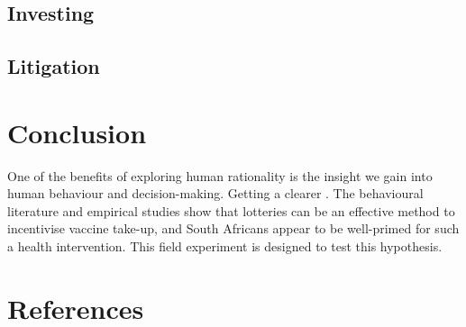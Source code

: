 \documentclass[11pt,preprint, authoryear]{elsarticle}
\numberwithin{equation}{section}
\numberwithin{figure}{section}
\numberwithin{table}{section}
\begin{document}
\hypertarget{investing}{%
\subsection{Investing}\label{investing}}

\hypertarget{litigation}{%
\subsection{Litigation}\label{litigation}}

\hypertarget{conclusion}{%
\section{\texorpdfstring{Conclusion
\label{con}}{Conclusion }}\label{conclusion}}

One of the benefits of exploring human rationality is the insight we
gain into human behaviour and decision-making. Getting a clearer . The
behavioural literature and empirical studies show that lotteries can be
an effective method to incentivise vaccine take-up, and South Africans
appear to be well-primed for such a health intervention. This field
experiment is designed to test this hypothesis.

\newpage

\hypertarget{references}{%
\section*{References}\label{references}}
\end{document}
